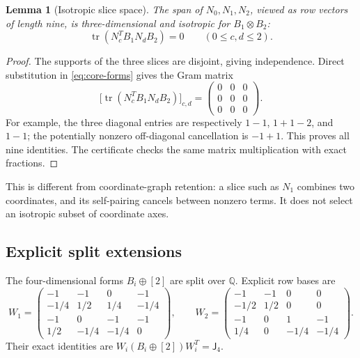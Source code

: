 \documentclass[11pt]{article}
\newtheorem{lemma}[theorem]{Lemma}
\theoremstyle{definition}\newtheorem{definition}[theorem]{Definition}
\theoremstyle{remark}\newtheorem{remark}[theorem]{Remark}
\newcommand{\tr}{\operatorname{tr}}
\newcommand{\Q}{\mathbb Q}
\newcommand{\J}{\mathsf J}
\begin{document}
\begin{lemma}[Isotropic slice space]\label{lem:core}
The span of $N_0,N_1,N_2$, viewed as row vectors of length nine, is three-dimensional and isotropic for $B_1\otimes B_2$:
\begin{equation}\label{eq:core-zero}
 \tr(N_c^TB_1N_dB_2)=0\qquad(0\leq c,d\leq2).
\end{equation}
\end{lemma}
\begin{proof}
The supports of the three slices are disjoint, giving independence. Direct substitution in \eqref{eq:core-forms} gives the Gram matrix
\[
 \bigl[\tr(N_c^TB_1N_dB_2)\bigr]_{c,d}=\begin{pmatrix}0&0&0\\0&0&0\\0&0&0\end{pmatrix}.
\]
For example, the three diagonal entries are respectively $1-1$, $1+1-2$, and $1-1$; the potentially nonzero off-diagonal cancellation is $-1+1$. This proves all nine identities. The certificate checks the same matrix multiplication with exact fractions.
\end{proof}

This is different from coordinate-graph retention: a slice such as $N_1$ combines two coordinates, and its self-pairing cancels between nonzero terms. It does not select an isotropic subset of coordinate axes.

\subsection{Explicit split extensions}

The four-dimensional forms $B_i\oplus[2]$ are split over $\Q$. Explicit row bases are
\begin{equation}\label{eq:witt-bases}
 W_1=\begin{pmatrix}
 -1&-1&0&-1\\-1/4&1/2&1/4&-1/4\\-1&0&-1&-1\\1/2&-1/4&-1/4&0
 \end{pmatrix},\qquad
 W_2=\begin{pmatrix}
 -1&-1&0&0\\-1/2&1/2&0&0\\-1&0&1&-1\\1/4&0&-1/4&-1/4
 \end{pmatrix}.
\end{equation}
Their exact identities are $W_i(B_i\oplus[2])W_i^T=\J_4$.
\end{document}
